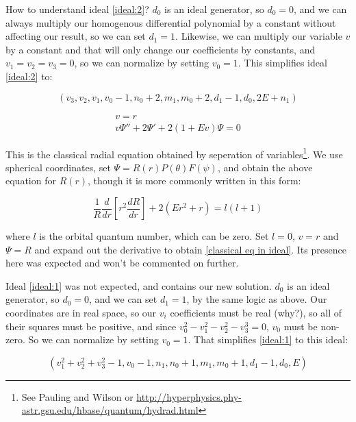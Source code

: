 \documentclass{article}
\begin{document}
How to understand ideal \eqref{ideal:2}?  $d_0$ is an ideal generator,
so $d_0=0$, and we can always multiply our homogenous differential polynomial by a constant without affecting our result, so we can set $d_1=1$.
Likewise, we can multiply our variable $v$ by a constant and that will only change our coefficients by constants,
and $v_1=v_2=v_3=0$, so we can normalize by setting $v_0=1$.  This simplifies ideal \eqref{ideal:2} to:

\begin{equation}
\left(v_{3}, v_{2}, v_{1}, v_{0} - 1, n_{0} + 2, m_{1}, m_{0} + 2, d_{1} - 1, d_{0}, 2 E + n_{1}\right)
\end{equation}

\begin{equation}
\label{classical eq in ideal}
\begin{gathered}
v=r \\
v \Psi'' + 2 \Psi' + 2(1 + E v) \Psi = 0
\end{gathered}
\end{equation}

This is the classical radial equation obtained by seperation of variables\footnote{See
Pauling and Wilson or
\url{http://hyperphysics.phy-astr.gsu.edu/hbase/quantum/hydrad.html}}.  We use
spherical coordinates, set $\Psi = R(r)P(\theta)F(\psi)$, and obtain the above equation for $R(r)$,
though it is more commonly written in this form:

\begin{equation}
\frac{1}{R} \frac{d}{dr}\left[ r^2 \frac{dR}{dr}\right] + 2(Er^2 + r) = l(l+1)
\end{equation}

where $l$ is the orbital quantum number, which can be zero.  Set $l=0$, $v=r$ and $\Psi=R$ and
expand out the derivative to obtain \eqref{classical eq in ideal}.  Its presence here was
expected and won't be commented on further.

Ideal \eqref{ideal:1} was not expected, and contains our new solution.
$d_0$ is an ideal generator,
so $d_0=0$, and we can set $d_1=1$, by the same logic as above.
Our coordinates are in real space, so our $v_i$ coefficients must be real (why?), so all of their squares must
be positive, and since $v_0^2-v_1^2-v_2^2-v_3^3=0$, $v_0$ must be non-zero.  So we can normalize by setting $v_0=1$.
That simplifies \eqref{ideal:1} to this ideal:

\begin{equation}
\left(v_{1}^{2} + v_{2}^{2} + v_{3}^{2} - 1, v_{0} - 1, n_{1}, n_{0} + 1, m_{1}, m_{0} + 1, d_{1} - 1, d_{0}, E\right)
\end{equation}
\end{document}
